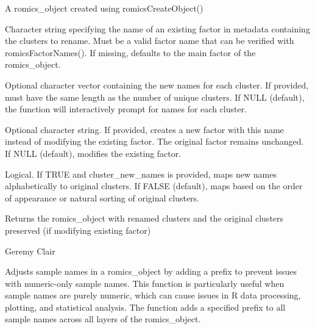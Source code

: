 \documentclass[a4paper]{book}
\begin{document}
%
\begin{Arguments}
\begin{ldescription}
\item[\code{romics\_object}] A romics\_object created using romicsCreateObject()

\item[\code{cluster\_factor}] Character string specifying the name of an existing factor in metadata containing the clusters to rename.
Must be a valid factor name that can be verified with romicsFactorNames().
If missing, defaults to the main factor of the romics\_object.

\item[\code{cluster\_new\_names}] Optional character vector containing the new names for each cluster.
If provided, must have the same length as the number of unique clusters.
If NULL (default), the function will interactively prompt for names for each cluster.

\item[\code{new\_factor\_name}] Optional character string. If provided, creates a new factor with this name instead of modifying the existing factor.
The original factor remains unchanged. If NULL (default), modifies the existing factor.

\item[\code{alphabetical\_mapping}] Logical. If TRUE and cluster\_new\_names is provided, maps new names alphabetically to original clusters.
If FALSE (default), maps based on the order of appearance or natural sorting of original clusters.
\end{ldescription}
\end{Arguments}
%
\begin{Value}
Returns the romics\_object with renamed clusters and the original clusters preserved (if modifying existing factor)
\end{Value}
%
\begin{Author}
Geremy Clair
\end{Author}
%
\begin{Description}
Adjusts sample names in a romics\_object by adding a prefix to prevent issues with numeric-only sample names.
This function is particularly useful when sample names are purely numeric, which can cause issues in R data processing,
plotting, and statistical analysis. The function adds a specified prefix to all sample names across all layers of the romics\_object.
\end{Description}
\end{document}
